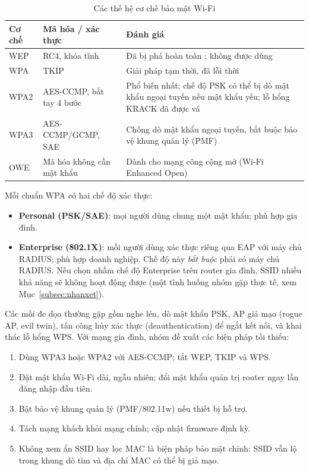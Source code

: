 \documentclass[12pt,a4paper]{article}
\numberwithin{figure}{section}
\numberwithin{table}{section}
\begin{document}
\begin{table}[H]
  \centering\small
  \caption{Các thế hệ cơ chế bảo mật Wi-Fi}
  \label{tab:baomat}
  \begin{tabularx}{\linewidth}{@{}l P{3.6cm} L@{}}
    \toprule
    \textbf{Cơ chế} & \textbf{Mã hóa / xác thực} & \textbf{Đánh giá}\\
    \midrule
    WEP & RC4, khóa tĩnh & Đã bị phá hoàn toàn \cite{fms2001}; không được dùng\\
    WPA & TKIP & Giải pháp tạm thời, đã lỗi thời\\
    WPA2 & AES-CCMP, bắt tay 4 bước & Phổ biến nhất; chế độ PSK có thể bị dò mật
    khẩu ngoại tuyến nếu mật khẩu yếu; lỗ hổng KRACK \cite{krack2017} đã được vá\\
    WPA3 & AES-CCMP/GCMP, SAE & Chống dò mật khẩu ngoại tuyến, bắt buộc bảo vệ
    khung quản lý (PMF) \cite{wpa3spec}\\
    OWE & Mã hóa không cần mật khẩu & Dành cho mạng công cộng mở (Wi-Fi Enhanced Open)\\
    \bottomrule
  \end{tabularx}
\end{table}

Mỗi chuẩn WPA có hai chế độ xác thực:
\begin{itemize}
  \item \textbf{Personal (PSK/SAE)}: mọi người dùng chung một mật khẩu; phù hợp
    gia đình.
  \item \textbf{Enterprise (802.1X)}: mỗi người dùng xác thực riêng qua EAP
    với máy chủ RADIUS; phù hợp doanh nghiệp. Chế độ này \emph{bắt buộc} phải
    có máy chủ RADIUS. Nếu chọn nhầm chế độ Enterprise trên router gia đình,
    SSID nhiều khả năng sẽ không hoạt động được (một tình huống nhóm gặp thực tế, xem
    Mục~\ref{subsec:nhanxet}).
\end{itemize}

Các mối đe dọa thường gặp gồm nghe lén, dò mật khẩu PSK, AP giả mạo (rogue
AP, evil twin), tấn công hủy xác thực (deauthentication) để ngắt kết nối, và
khai thác lỗ hổng WPS. Với mạng gia đình, nhóm đề xuất các biện pháp tối thiểu:
\begin{enumerate}
  \item Dùng WPA3 hoặc WPA2 với AES-CCMP; tắt WEP, TKIP và WPS.
  \item Đặt mật khẩu Wi-Fi dài, ngẫu nhiên; đổi mật khẩu quản trị router ngay
    lần đăng nhập đầu tiên.
  \item Bật bảo vệ khung quản lý (PMF/802.11w) nếu thiết bị hỗ trợ.
  \item Tách mạng khách khỏi mạng chính; cập nhật firmware định kỳ.
  \item Không xem ẩn SSID hay lọc MAC là biện pháp bảo mật chính: SSID vẫn lộ
    trong khung dò tìm và địa chỉ MAC có thể bị giả mạo.
\end{enumerate}
\end{document}
